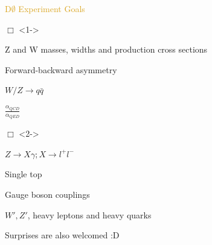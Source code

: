 \begin{frame}{\textcolor{Goldenrod}{D$\emptyset$ Experiment Goals}}
  \itt
\item[$\Box$]<1-> 
\itt
\item Z and W masses, widths and production cross sections
\item Forward-backward asymmetry
\item $W/Z \to q\bar{q}$
\item $\frac{\alpha_{QCD}}{\alpha_{QED}}$ 
  \tti

\item[$\Box$]<2-> \\
  \itt
\item $Z \to X \gamma; X\to l^+l^-$
\item Single top
\item Gauge boson couplings
\item {}
\item {}
\item $W', Z'$, heavy leptons and heavy quarks
\item Surprises are also welcomed :D 
  \tti
  
  \tti
\end{frame}  

  
